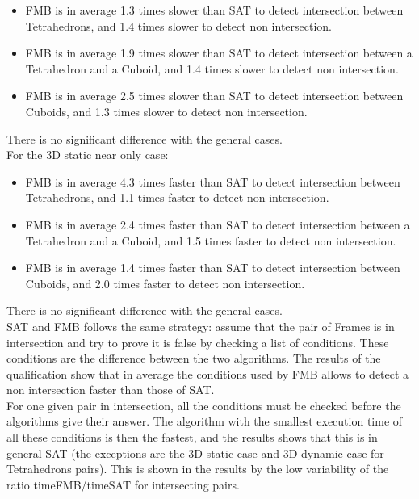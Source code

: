 \documentclass[12pt, a4paper]{article}
\begin{document}
\begin{itemize}
\item FMB is in average 1.3 times slower than SAT to detect intersection between Tetrahedrons, and 1.4 times slower to detect non intersection.\\
\item FMB is in average 1.9 times slower than SAT to detect intersection between a Tetrahedron and a Cuboid, and 1.4 times slower to detect non intersection.\\
\item FMB is in average 2.5 times slower than SAT to detect intersection between Cuboids, and 1.3 times slower to detect non intersection.\\
\end{itemize}

There is no significant difference with the general cases.\\ 

For the 3D static near only case:\\

\begin{itemize}
\item FMB is in average 4.3 times faster than SAT to detect intersection between Tetrahedrons, and 1.1 times faster to detect non intersection.\\
\item FMB is in average 2.4 times faster than SAT to detect intersection between a Tetrahedron and a Cuboid, and 1.5 times faster to detect non intersection.\\
\item FMB is in average 1.4 times faster than SAT to detect intersection between Cuboids, and 2.0 times faster to detect non intersection.\\
\end{itemize}

There is no significant difference with the general cases.\\ 

SAT and FMB follows the same strategy: assume that the pair of Frames is in intersection and try to prove it is false by checking a list of conditions. These conditions are the difference between the two algorithms. The results of the qualification show that in average the conditions used by FMB allows to detect a non intersection faster than those of SAT.\\

For one given pair in intersection, all the conditions must be checked before the algorithms give their answer. The algorithm with the smallest execution time of all these conditions is then the fastest, and the results shows that this is in general SAT (the exceptions are the 3D static case and 3D dynamic case for Tetrahedrons pairs). This is shown in the results by the low variability of the ratio timeFMB/timeSAT for intersecting pairs.\\
\end{document}
